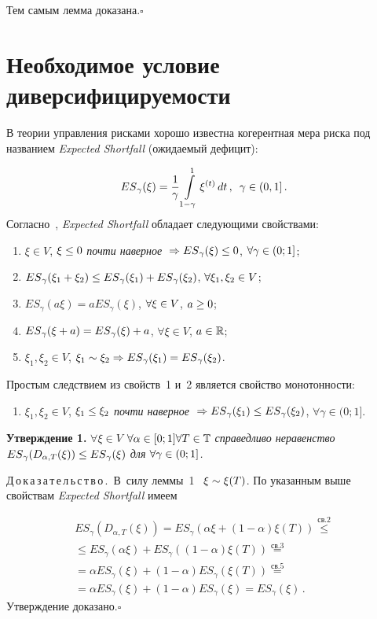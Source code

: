 \begin{multicols}{2}
Тем самым лемма доказана.\hfill$\square$


\section{Необходимое условие диверсифицируемости}

В теории управления рисками хорошо известна когерентная мера риска
под названием \textit{Expected Shortfall} (ожидаемый дефицит):

\noindent
$$
{ES}_\gamma(\xi) = \displaystyle\frac{\displaystyle 1\mathstrut}{\displaystyle \gamma\mathstrut} \int\limits_{1-\gamma}^1 \xi^{(t)} \,dt\,,\enskip
\gamma \in  (0,1]\,.
$$
Согласно~\cite{es}, \textit{Expected Shortfall} обладает следующими
свойствами:
\begin{enumerate}
\item $\xi\in V$, $\xi\hm\le0$  \textit{почти наверное} ${}\Rightarrow {ES}_\gamma(\xi)\hm\le0$, 
$\forall \gamma\hm \in (0;1]$;
\item ${ES}_\gamma(\xi_1+\xi_2) \le {ES}_\gamma(\xi_1) \hm+ {ES}_\gamma(\xi_2)$, 
$\forall \xi_1,\xi_2\hm\in V$;
\item ${ES}_\gamma(a\xi) = a {ES}_\gamma(\xi)$, $\forall \xi\hm\in V$, $a\hm\ge 0$;
\item ${ES}_\gamma(\xi+a) = {ES}_\gamma(\xi)\hm+a$, $\forall \xi\in V$, $a\hm\in\mathbb{R}$;
\item $\xi_1,\xi_2\in V$, $\xi_1\hm\sim\xi_2 \hm\Rightarrow{ES}_\gamma(\xi_1)\hm={ES}_\gamma(\xi_2)$.
\end{enumerate}

Простым следствием из свойств~1 и~2 является свойство монотонности:
\begin{enumerate}[6.]
\item $\xi_1,\xi_2\in V$, $\xi_1 \hm\le \xi_2$ \textit{почти наверное} $
{}\Rightarrow {ES}_\gamma(\xi_1) \hm\le {ES}_\gamma(\xi_2)$, $\forall \gamma \in (0;1]$.
\end{enumerate}

\medskip

\noindent
\textbf{Утверждение 1.} \textit{$\forall \xi \in V$ $\forall \alpha \in [0;1] 
\forall T \hm\in \classT$ справедливо неравенство 
${ES}_\gamma ( D_{\alpha , T}(\xi)) \hm\le {ES}_\gamma (\xi)$  для $\forall
\gamma \hm\in (0;1]$. }

\smallskip

\noindent
Д\,о\,к\,а\,з\,а\,т\,е\,л\,ь\,с\,т\,в\,о\,.\ В~силу леммы~1 \ $\xi \hm\sim \xi(T)$. По
указанным выше свойствам \textit{Expected Shortfall} имеем

\noindent
\begin{multline*}
{ES}_\gamma ( D_{\alpha , T}(\xi)) =
{ES}_\gamma ( \alpha \xi + (1 - \alpha) \xi(T)) \stackrel{\text{св.2}}{\le}{} \\
{}\le {ES}_\gamma ( \alpha \xi ) + {ES}_\gamma  ( (1 - \alpha) \xi(T)) \stackrel{\text{св.3}}{=}{}\\
{}=\alpha {ES}_\gamma ( \xi ) + (1 - \alpha) {ES}_\gamma ( \xi(T)) \stackrel{\text{св.5}}{=}  \\
= \alpha {ES}_\gamma ( \xi ) + (1 - \alpha) {ES}_\gamma ( \xi ) =
{ES}_\gamma ( \xi )\,.
\end{multline*}
Утверждение доказано.\hfill$\square$


\end{multicols}
